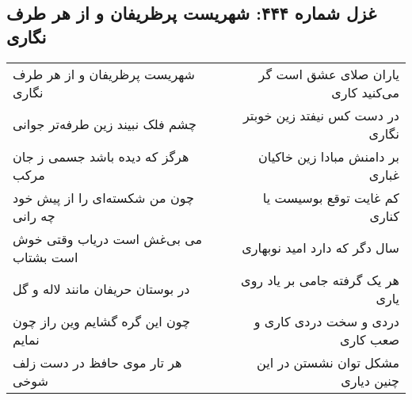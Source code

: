 \begin{center}
\section*{غزل شماره ۴۴۴: شهریست پرظریفان و از هر طرف نگاری}
\label{sec:sh444}
\begin{longtable}{l p{0.5cm} r}
شهریست پرظریفان و از هر طرف نگاری
&&
یاران صلای عشق است گر می‌کنید کاری
\\
چشم فلک نبیند زین طرفه‌تر جوانی
&&
در دست کس نیفتد زین خوبتر نگاری
\\
هرگز که دیده باشد جسمی ز جان مرکب
&&
بر دامنش مبادا زین خاکیان غباری
\\
چون من شکسته‌ای را از پیش خود چه رانی
&&
کم غایت توقع بوسیست یا کناری
\\
می بی‌غش است دریاب وقتی خوش است بشتاب
&&
سال دگر که دارد امید نوبهاری
\\
در بوستان حریفان مانند لاله و گل
&&
هر یک گرفته جامی بر یاد روی یاری
\\
چون این گره گشایم وین راز چون نمایم
&&
دردی و سخت دردی کاری و صعب کاری
\\
هر تار موی حافظ در دست زلف شوخی
&&
مشکل توان نشستن در این چنین دیاری
\\
\end{longtable}
\end{center}
